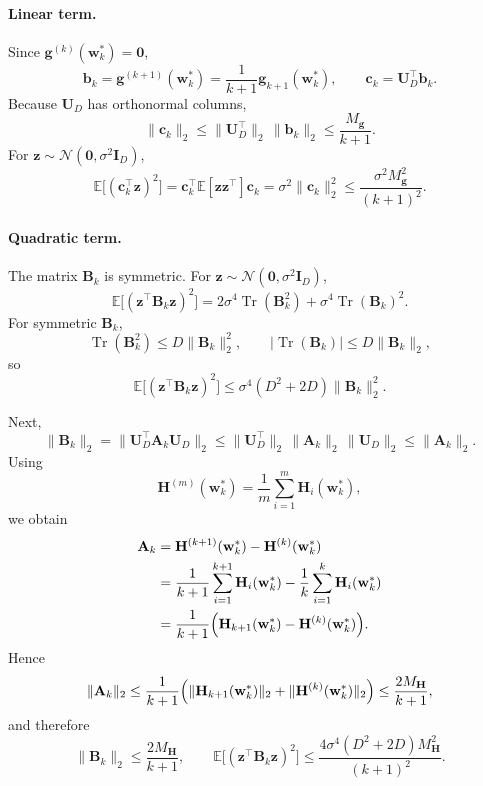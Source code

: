 \documentclass{article}
\begin{document}
\paragraph{Linear term.}
Since $\mathbf g^{(k)}(\mathbf w_k^*)=\mathbf 0$,
\[
\mathbf b_k
=
\mathbf g^{(k+1)}(\mathbf w_k^*)
=
\frac{1}{k+1}\mathbf g_{k+1}(\mathbf w_k^*),
\qquad
\mathbf c_k=\mathbf U_D^\top\mathbf b_k.
\]
Because $\mathbf U_D$ has orthonormal columns,
\[
\|\mathbf c_k\|_2
\le
\|\mathbf U_D^\top\|_2\,\|\mathbf b_k\|_2
\le
\frac{M_{\mathbf g}}{k+1}.
\]
For $\mathbf z\sim\mathcal N(\mathbf 0,\sigma^2\mathbf I_D)$,
\begin{equation}
\label{eq:app-linear-new}
\mathbb E\bigl[(\mathbf c_k^\top\mathbf z)^2\bigr]
=
\mathbf c_k^\top \mathbb E[\mathbf z\mathbf z^\top]\mathbf c_k
=
\sigma^2\|\mathbf c_k\|_2^2
\le
\frac{\sigma^2 M_{\mathbf g}^2}{(k+1)^2}.
\end{equation}

\paragraph{Quadratic term.}
The matrix $\mathbf B_k$ is symmetric. For $\mathbf z\sim\mathcal N(\mathbf 0,\sigma^2\mathbf I_D)$,
\begin{equation}
\label{eq:app-quad-moment-new}
\mathbb E\bigl[(\mathbf z^\top\mathbf B_k\mathbf z)^2\bigr]
=
2\sigma^4 \operatorname{Tr}(\mathbf B_k^2)
+
\sigma^4 \operatorname{Tr}(\mathbf B_k)^2.
\end{equation}
For symmetric $\mathbf B_k$,
\[
\operatorname{Tr}(\mathbf B_k^2)\le D\|\mathbf B_k\|_2^2,
\qquad
|\operatorname{Tr}(\mathbf B_k)|\le D\|\mathbf B_k\|_2,
\]
so
\begin{equation}
\label{eq:app-quad-bound-new}
\mathbb E\bigl[(\mathbf z^\top\mathbf B_k\mathbf z)^2\bigr]
\le
\sigma^4(D^2+2D)\|\mathbf B_k\|_2^2.
\end{equation}

Next,
\[
\|\mathbf B_k\|_2
=
\|\mathbf U_D^\top \mathbf A_k \mathbf U_D\|_2
\le
\|\mathbf U_D^\top\|_2\,\|\mathbf A_k\|_2\,\|\mathbf U_D\|_2
\le
\|\mathbf A_k\|_2.
\]
Using
\[
\mathbf H^{(m)}(\mathbf w_k^*)
=
\frac1m\sum_{i=1}^m \mathbf H_i(\mathbf w_k^*),
\]
we obtain
\begin{align*}
\mathbf A_k
&=
\mathbf H^{(k+1)}(\mathbf w_k^*)-\mathbf H^{(k)}(\mathbf w_k^*)
\\
&=
\frac{1}{k+1}\sum_{i=1}^{k+1}\mathbf H_i(\mathbf w_k^*)
-
\frac{1}{k}\sum_{i=1}^{k}\mathbf H_i(\mathbf w_k^*)
\\
&=
\frac{1}{k+1}
\Bigl(
\mathbf H_{k+1}(\mathbf w_k^*)-\mathbf H^{(k)}(\mathbf w_k^*)
\Bigr).
\end{align*}
Hence
\[
\|\mathbf A_k\|_2
\le
\frac{1}{k+1}
\Bigl(
\|\mathbf H_{k+1}(\mathbf w_k^*)\|_2
+
\|\mathbf H^{(k)}(\mathbf w_k^*)\|_2
\Bigr)
\le
\frac{2M_{\mathbf H}}{k+1},
\]
and therefore
\begin{equation}
\label{eq:app-B-bound-new}
\|\mathbf B_k\|_2\le \frac{2M_{\mathbf H}}{k+1},
\qquad
\mathbb E\bigl[(\mathbf z^\top\mathbf B_k\mathbf z)^2\bigr]
\le
\frac{4\sigma^4(D^2+2D)M_{\mathbf H}^2}{(k+1)^2}.
\end{equation}
\end{document}
